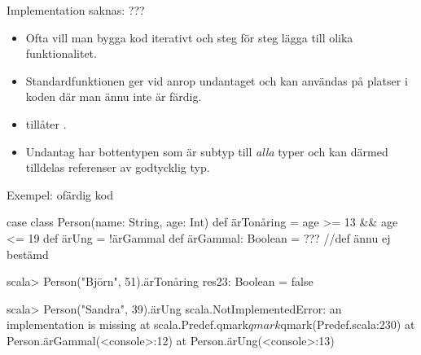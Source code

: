 



\begin{Slide}{Implementation saknas: ???}
\begin{itemize}
\item Ofta vill man bygga kod iterativt och steg för steg lägga till olika funktionalitet.

\item Standardfunktionen  ger vid anrop undantaget  och kan användas på platser i koden där man ännu inte är färdig.

\item {} tillåter .

\pause

\item Undantag har bottentypen  som är subtyp till \emph{alla} typer och kan därmed tilldelas referenser av godtycklig typ.


\end{itemize}
\end{Slide}

\begin{Slide}{Exempel: ofärdig kod}
\begin{Code}[basicstyle=\SlideFontSize{9}{11}\ttfamily\selectfont]
case class Person(name: String, age: Int){
  def ärTonåring = age >= 13 && age <= 19
  def ärUng = !ärGammal
  def ärGammal: Boolean = ???   //def ännu ej bestämd
}
\end{Code}
\begin{REPLnonum}
scala> Person("Björn", 51).ärTonåring
res23: Boolean = false

scala> Person("Sandra", 39).ärUng
scala.NotImplementedError: an implementation is missing
  at scala.Predef$.$qmark$qmark$qmark(Predef.scala:230)
  at Person.ärGammal(<console>:12)
  at Person.ärUng(<console>:13)
\end{REPLnonum}
\end{Slide}


